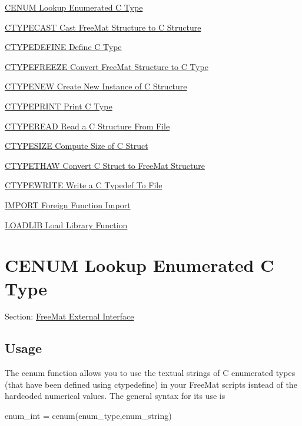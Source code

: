 
\begin{DoxyItemize}
\item \hyperlink{external_cenum}{C\-E\-N\-U\-M Lookup Enumerated C Type}  
\item \hyperlink{external_ctypecast}{C\-T\-Y\-P\-E\-C\-A\-S\-T Cast Free\-Mat Structure to C Structure}  
\item \hyperlink{external_ctypedefine}{C\-T\-Y\-P\-E\-D\-E\-F\-I\-N\-E Define C Type}  
\item \hyperlink{external_ctypefreeze}{C\-T\-Y\-P\-E\-F\-R\-E\-E\-Z\-E Convert Free\-Mat Structure to C Type}  
\item \hyperlink{external_ctypenew}{C\-T\-Y\-P\-E\-N\-E\-W Create New Instance of C Structure}  
\item \hyperlink{external_ctypeprint}{C\-T\-Y\-P\-E\-P\-R\-I\-N\-T Print C Type}  
\item \hyperlink{external_ctyperead}{C\-T\-Y\-P\-E\-R\-E\-A\-D Read a C Structure From File}  
\item \hyperlink{external_ctypesize}{C\-T\-Y\-P\-E\-S\-I\-Z\-E Compute Size of C Struct}  
\item \hyperlink{external_ctypethaw}{C\-T\-Y\-P\-E\-T\-H\-A\-W Convert C Struct to Free\-Mat Structure}  
\item \hyperlink{external_ctypewrite}{C\-T\-Y\-P\-E\-W\-R\-I\-T\-E Write a C Typedef To File}  
\item \hyperlink{external_import}{I\-M\-P\-O\-R\-T Foreign Function Import}  
\item \hyperlink{external_loadlib}{L\-O\-A\-D\-L\-I\-B Load Library Function}  
\end{DoxyItemize}\hypertarget{external_cenum}{}\section{C\-E\-N\-U\-M Lookup Enumerated C Type}\label{external_cenum}
Section\-: \hyperlink{sec_external}{Free\-Mat External Interface} \hypertarget{vtkwidgets_vtkxyplotwidget_Usage}{}\subsection{Usage}\label{vtkwidgets_vtkxyplotwidget_Usage}
The {\ttfamily cenum} function allows you to use the textual strings of C enumerated types (that have been defined using {\ttfamily ctypedefine}) in your Free\-Mat scripts isntead of the hardcoded numerical values. The general syntax for its use is \begin{DoxyVerb}  enum_int = cenum(enum_type,enum_string)
\end{DoxyVerb}
